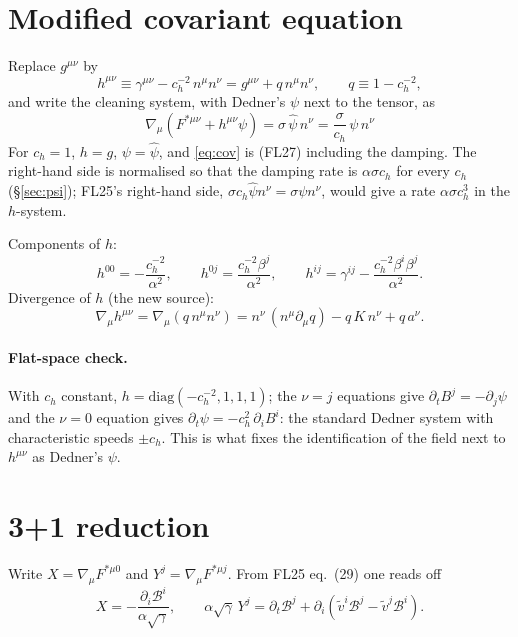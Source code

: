 \documentclass[11pt,a4paper]{article}
\newcommand{\cB}{\mathcal{B}}
\newcommand{\ph}{\hat\psi}
\newcommand{\ch}{c_h}
\newcommand{\pd}{\partial}
\newcommand{\sg}{\sqrt{\gamma}}
\begin{document}
\section{Modified covariant equation}
Replace $g^{\mu\nu}$ by
\begin{equation}
h^{\mu\nu}\equiv\gamma^{\mu\nu}-\ch^{-2}\,n^\mu n^\nu=g^{\mu\nu}+q\,n^\mu n^\nu,\qquad q\equiv 1-\ch^{-2},
\label{eq:h}
\end{equation}
and write the cleaning system, with Dedner's $\psi$ next to the tensor, as
\begin{equation}
\boxed{\;\nabla_\mu\!\left(F^{*\mu\nu}+h^{\mu\nu}\psi\right)=\sigma\,\ph\,n^\nu=\frac{\sigma}{\ch}\,\psi\,n^\nu\;}
\label{eq:cov}
\end{equation}
For $\ch=1$, $h=g$, $\psi=\ph$, and \eqref{eq:cov} is (FL27) including the damping. The right-hand side is normalised so that the damping rate is $\alpha\sigma\ch$ for every $\ch$ (\S\ref{sec:psi}); FL25's right-hand side, $\sigma\ch\ph n^\nu=\sigma\psi n^\nu$, would give a rate $\alpha\sigma\ch^3$ in the $h$-system.

Components of $h$:
\begin{equation}
h^{00}=-\frac{\ch^{-2}}{\alpha^2},\qquad
h^{0j}=\frac{\ch^{-2}\beta^j}{\alpha^2},\qquad
h^{ij}=\gamma^{ij}-\frac{\ch^{-2}\beta^i\beta^j}{\alpha^2}.
\end{equation}
Divergence of $h$ (the new source):
\begin{equation}
\nabla_\mu h^{\mu\nu}=\nabla_\mu\!\left(q\,n^\mu n^\nu\right)
= n^\nu\,(n^\mu\pd_\mu q)-q\,K\,n^\nu+q\,a^\nu .
\label{eq:divh}
\end{equation}

\paragraph{Flat-space check.} With $\ch$ constant, $h=\mathrm{diag}(-\ch^{-2},1,1,1)$; the $\nu=j$ equations give $\pd_tB^j=-\pd_j\psi$ and the $\nu=0$ equation gives $\pd_t\psi=-\ch^2\,\pd_iB^i$: the standard Dedner system with characteristic speeds $\pm\ch$. This is what fixes the identification of the field next to $h^{\mu\nu}$ as Dedner's $\psi$.

\section{3+1 reduction}
Write $X=\nabla_\mu F^{*\mu0}$ and $Y^j=\nabla_\mu F^{*\mu j}$. From FL25 eq.~(29) one reads off
\begin{equation}
X=-\frac{\pd_i\cB^i}{\alpha\sg},\qquad
\alpha\sg\,Y^j=\pd_t\cB^j+\pd_i\!\left(\tilde v^i\cB^j-\tilde v^j\cB^i\right).
\end{equation}
\end{document}

